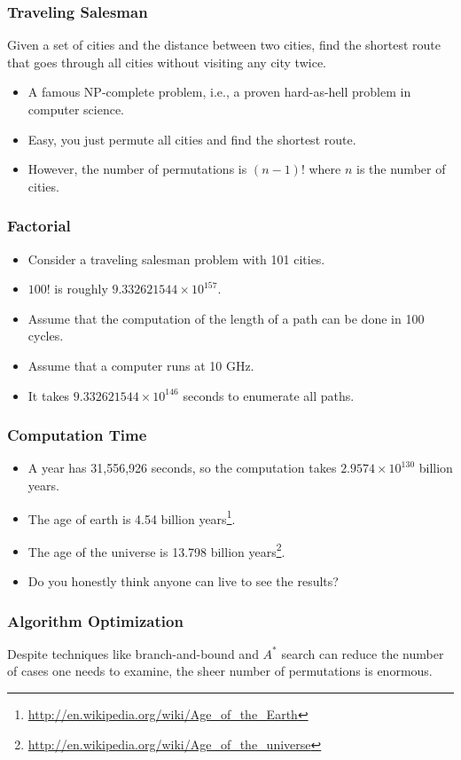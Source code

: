 \documentclass{beamer}
\begin{document}
\begin{CJK}{UTF8}{bsmi}
\begin{frame}
\frametitle{Traveling Salesman} Given a set of cities and the distance
between two cities, find the shortest route that goes through all
cities without visiting any city twice.
\begin{itemize}
\item A famous NP-complete problem, i.e., a proven hard-as-hell
  problem in computer science.
\item Easy, you just permute all cities and find the shortest route.
\item However, the number of permutations is $(n-1)!$ where $n$ is the
  number of cities.
\end{itemize}
\end{frame}

\begin{frame}
\frametitle{Factorial}
\begin{itemize}
\item Consider a traveling salesman problem with 101 cities.
\item $100!$ is roughly $9.332621544 \times 10^{157}$.
\item Assume that the computation of the length of a path can be done
  in 100 cycles.
\item Assume that a computer runs at 10 GHz.
\item It takes $9.332621544 \times 10^{146}$ seconds to enumerate all
  paths.
\end{itemize}
\end{frame}

\begin{frame}
\frametitle{Computation Time}
\begin{itemize}
\item A year has 31,556,926 seconds, so the computation takes $2.9574
  \times 10^{130}$ billion years.
\item The age of earth is 4.54 billion
  years\footnote{\url{http://en.wikipedia.org/wiki/Age_of_the_Earth}}.
\item The age of the universe is 13.798 billion
  years\footnote{\url{http://en.wikipedia.org/wiki/Age_of_the_universe}}.
\item Do you honestly think anyone can live to see the results?
\end{itemize}
\end{frame}

\begin{frame}
\frametitle{Algorithm Optimization} Despite techniques like
branch-and-bound and $A^*$ search can reduce the number of cases one
needs to examine, the sheer number of permutations is enormous.
\end{frame}


\end{CJK}
\end{document}
